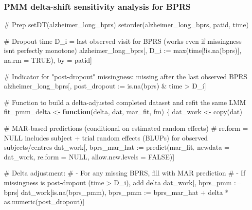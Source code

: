 \documentclass[
  9pt,
  letterpaper,
  DIV=11,
  numbers=noendperiod]{scrartcl}
\newenvironment{Shaded}{\begin{snugshade}}{\end{snugshade}}
\newcommand{\AttributeTok}[1]{\textcolor[rgb]{0.40,0.45,0.13}{#1}}
\newcommand{\CommentTok}[1]{\textcolor[rgb]{0.37,0.37,0.37}{#1}}
\newcommand{\ConstantTok}[1]{\textcolor[rgb]{0.56,0.35,0.01}{#1}}
\newcommand{\ControlFlowTok}[1]{\textcolor[rgb]{0.00,0.23,0.31}{\textbf{#1}}}
\newcommand{\ErrorTok}[1]{\textcolor[rgb]{0.68,0.00,0.00}{#1}}
\newcommand{\FunctionTok}[1]{\textcolor[rgb]{0.28,0.35,0.67}{#1}}
\newcommand{\NormalTok}[1]{\textcolor[rgb]{0.00,0.23,0.31}{#1}}
\newcommand{\OtherTok}[1]{\textcolor[rgb]{0.00,0.23,0.31}{#1}}
\newcommand{\SpecialCharTok}[1]{\textcolor[rgb]{0.37,0.37,0.37}{#1}}
\begin{document}
\subsubsection{PMM delta-shift sensitivity analysis for
BPRS}\label{pmm-delta-shift-sensitivity-analysis-for-bprs}

\begin{Shaded}
\begin{Highlighting}[]
\CommentTok{\# Prep}
\FunctionTok{setDT}\NormalTok{(alzheimer\_long\_bprs)}
\FunctionTok{setorder}\NormalTok{(alzheimer\_long\_bprs, patid, time)}

\CommentTok{\# Dropout time D\_i = last observed visit for BPRS (works even if missingness isn\textquotesingle{}t perfectly monotone)}
\NormalTok{alzheimer\_long\_bprs[, D\_i }\SpecialCharTok{:}\ErrorTok{=} \FunctionTok{max}\NormalTok{(time[}\SpecialCharTok{!}\FunctionTok{is.na}\NormalTok{(bprs)], }\AttributeTok{na.rm =} \ConstantTok{TRUE}\NormalTok{), by }\OtherTok{=}\NormalTok{ patid]}

\CommentTok{\# Indicator for "post{-}dropout" missingness: missing after the last observed BPRS}
\NormalTok{alzheimer\_long\_bprs[, post\_dropout }\SpecialCharTok{:}\ErrorTok{=} \FunctionTok{is.na}\NormalTok{(bprs) }\SpecialCharTok{\&}\NormalTok{ time }\SpecialCharTok{\textgreater{}}\NormalTok{ D\_i]}

\CommentTok{\# Function to build a delta{-}adjusted completed dataset and refit the same LMM}
\NormalTok{fit\_pmm\_delta }\OtherTok{\textless{}{-}} \ControlFlowTok{function}\NormalTok{(delta, dat, mar\_fit, fm) \{}
\NormalTok{  dat\_work }\OtherTok{\textless{}{-}} \FunctionTok{copy}\NormalTok{(dat)}

  \CommentTok{\# MAR{-}based predictions (conditional on estimated random effects)}
  \CommentTok{\# re.form = NULL includes subject + trial random effects (BLUPs) for observed subjects/centres}
\NormalTok{  dat\_work[, bprs\_mar\_hat }\SpecialCharTok{:}\ErrorTok{=} \FunctionTok{predict}\NormalTok{(mar\_fit, }\AttributeTok{newdata =}\NormalTok{ dat\_work, }\AttributeTok{re.form =} \ConstantTok{NULL}\NormalTok{, }\AttributeTok{allow.new.levels =} \ConstantTok{FALSE}\NormalTok{)]}

  \CommentTok{\# Delta adjustment:}
  \CommentTok{\# {-} For any missing BPRS, fill with MAR prediction}
  \CommentTok{\# {-} If missingness is post{-}dropout (time \textgreater{} D\_i), add delta}
\NormalTok{  dat\_work[, bprs\_pmm }\SpecialCharTok{:}\ErrorTok{=}\NormalTok{ bprs]}
\NormalTok{  dat\_work[}\FunctionTok{is.na}\NormalTok{(bprs\_pmm), bprs\_pmm }\SpecialCharTok{:}\ErrorTok{=}\NormalTok{ bprs\_mar\_hat }\SpecialCharTok{+}\NormalTok{ delta }\SpecialCharTok{*} \FunctionTok{as.numeric}\NormalTok{(post\_dropout)]}


\end{Highlighting}
\end{Shaded}
\end{document}

